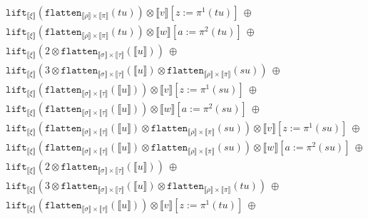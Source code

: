 \documentclass[a4paper,UKenglish,cleveref,autoref,numberwithinsect]{lipics-v2019}
\theoremstyle{definition}
\newcommand{\flatten}{\mathtt{flatten}}
\newcommand{\lift}{\mathtt{lift}}
\newcommand{\typeinterpret}[1]{\llbracket #1 \rrbracket}
\newcommand{\interpret}[1]{\llbracket #1 \rrbracket}
\begin{document}
\begin{itemize}
\[\begin{array}{l}
  \phantom{A}
    \lift_{\typeinterpret{\xi}}(\flatten_{\typeinterpret{\rho} \times
    \typeinterpret{\pi}}(tu)) \otimes \interpret{v}[z:=\pi^1(tu)]\
    \oplus \\
  \phantom{A}
    \lift_{\typeinterpret{\xi}}(\flatten_{\typeinterpret{\rho}
    \times \typeinterpret{\pi}}(tu)) \otimes \interpret{w}[a:=\pi^2(tu)]
    \ \oplus \\
  \phantom{A}
    \lift_{\typeinterpret{\xi}}(2 \otimes \flatten_{
    \typeinterpret{\sigma} \times \typeinterpret{\tau}}(
    \interpret{u}))\ \oplus \\
  \phantom{A}
    \lift_{\typeinterpret{\xi}}(3 \otimes \flatten_{
    \typeinterpret{\sigma} \times \typeinterpret{\tau}}(
    \interpret{u}) \otimes \flatten_{
    \typeinterpret{\rho} \times \typeinterpret{\pi}}(su))\ \oplus \\
  \phantom{A}
    \lift_{\typeinterpret{\xi}}(\flatten_{\typeinterpret{\sigma}
    \times \typeinterpret{\tau}}(\interpret{u})) \otimes
    \interpret{v}[z:=\pi^1(su)]\ \oplus \\
  \phantom{A}
    \lift_{\typeinterpret{\xi}}(\flatten_{\typeinterpret{\sigma}
    \times \typeinterpret{\tau}}(\interpret{u})) \otimes
    \interpret{w}[a:=\pi^2(su)]\ \oplus \\
  \phantom{A}
    \lift_{\typeinterpret{\xi}}(\flatten_{\typeinterpret{\sigma}
    \times \typeinterpret{\tau}}(\interpret{u}) \otimes
    \flatten_{\typeinterpret{\rho} \times
    \typeinterpret{\pi}}(su)) \otimes \interpret{v}[z:=\pi^1(su)]\
    \oplus \\
  \phantom{A}
    \lift_{\typeinterpret{\xi}}(\flatten_{\typeinterpret{\sigma}
    \times \typeinterpret{\tau}}(\interpret{u}) \otimes
    \flatten_{\typeinterpret{\rho}
    \times \typeinterpret{\pi}}(su)) \otimes \interpret{w}[a:=\pi^2(su)]
    \ \oplus \\
  \phantom{A}
    \lift_{\typeinterpret{\xi}}(2 \otimes \flatten_{
    \typeinterpret{\sigma} \times \typeinterpret{\tau}}(
    \interpret{u}))\ \oplus \\
  \phantom{A}
    \lift_{\typeinterpret{\xi}}(3 \otimes \flatten_{
    \typeinterpret{\sigma} \times \typeinterpret{\tau}}(
    \interpret{u}) \otimes \flatten_{
    \typeinterpret{\rho} \times \typeinterpret{\pi}}(tu))\ \oplus \\
  \phantom{A}
    \lift_{\typeinterpret{\xi}}(\flatten_{\typeinterpret{\sigma}
    \times \typeinterpret{\tau}}(\interpret{u})) \otimes
    \interpret{v}[z:=\pi^1(tu)]\ \oplus \\
  \phantom{A}

\end{array}\]
\end{itemize}
\end{document}
